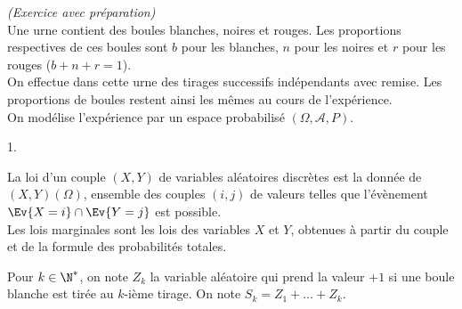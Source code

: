 \documentclass[11pt]{article}%
\begin{document}
 \begin{exercice}{\it (Exercice avec préparation)}~\\
 Une urne contient des boules blanches, noires et rouges. Les
proportions respectives de ces boules sont $b$ pour les blanches, $n$
pour les noires et $r$ pour les rouges ($b + n + r = 1$). \\
 On effectue dans cette urne des tirages successifs indépendants avec
remise. Les proportions de boules restent ainsi les mêmes au cours de
l'expérience. \\
 On modélise l'expérience par un espace probabilisé $(\Omega,
\mathcal{A}, P)$.
 \begin{noliste}{1.}
 \setlength{\itemsep}{4mm}
 \item La loi d'un couple $(X,Y)$ de variables aléatoires discrètes est
la donnée de $(X,Y) (\Omega)$, ensemble des couples $(i,j)$ de valeurs
telles que l'évènement $\Ev{X = i} \cap \Ev{Y = j}$ est possible. \\
 Les lois marginales sont les lois des variables $X$ et $Y$, obtenues à
partir du couple et de la formule des probabilités totales. \\
 \item Pour $k \in \N^*$, on note $Z_{k}$ la variable aléatoire qui
prend la valeur $ + 1$ si une boule blanche est tirée au $k$-ième
tirage. On note $S_{k} = Z_{1} + \dots + Z_{k}$.
\end{noliste}
\end{exercice}
\end{document}
